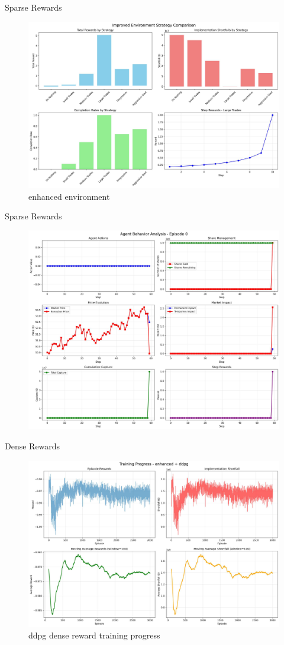 \documentclass[11pt,aspectratio=169]{beamer}   %
\begin{document}
\begin{frame}{Sparse Rewards}
	\begin{figure}[ht]
		\centering
		\includegraphics[width=0.6\linewidth]{improved_env_comparison.pdf}
		\caption{enhanced environment}
	\end{figure}
\end{frame}

\begin{frame}{Sparse Rewards}
	\begin{figure}[ht]
		\centering
		\includegraphics[width=0.6\linewidth]{agent_behavior_episode_0.pdf}
	\end{figure}
\end{frame}

\begin{frame}{Dense Rewards}
	\begin{figure}[ht]
		\centering
		\includegraphics[width=0.6\linewidth]{training_progress_ddpg.pdf}
		\caption{ddpg dense reward training progress}
	\end{figure}
\end{frame}
\end{document}
